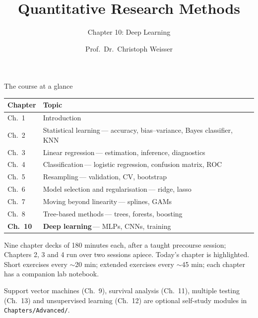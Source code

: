 \documentclass[aspectratio=169,11pt]{beamer}
\title{Quantitative Research Methods}
\subtitle{Chapter 10: Deep Learning}
\author{Prof.\ Dr.\ Christoph Weisser}
\date{}\graphicspath{{images/}}
\begin{document}
\begin{frame}[plain]\titlepage\end{frame}

\begin{frame}{The course at a glance}
  \vspace{-1.5mm}
  \begin{center}
  \scriptsize
  \setlength{\tabcolsep}{5pt}
  \renewcommand{\arraystretch}{1.30}
  \begin{tabular}{@{\hspace{2pt}}l >{\raggedright\arraybackslash}p{}@{\hspace{2pt}}}
    \toprule
    \textbf{Chapter} & \textbf{Topic} \\
    \midrule
     {\color{accent}Ch.\ 1} & Introduction \\
    \rowcolor{black!3} {\color{accent}Ch.\ 2} & Statistical learning\,{\color{black!45}--- accuracy, bias--variance, Bayes classifier, KNN} \\
     {\color{accent}Ch.\ 3} & Linear regression\,{\color{black!45}--- estimation, inference, diagnostics} \\
    \rowcolor{black!3} {\color{accent}Ch.\ 4} & Classification\,{\color{black!45}--- logistic regression, confusion matrix, ROC} \\
     {\color{accent}Ch.\ 5} & Resampling\,{\color{black!45}--- validation, CV, bootstrap} \\
    \rowcolor{black!3} {\color{accent}Ch.\ 6} & Model selection and regularisation\,{\color{black!45}--- ridge, lasso} \\
     {\color{accent}Ch.\ 7} & Moving beyond linearity\,{\color{black!45}--- splines, GAMs} \\
    \rowcolor{black!3} {\color{accent}Ch.\ 8} & Tree-based methods\,{\color{black!45}--- trees, forests, boosting} \\
    \rowcolor{accent!18} \textbf{Ch.\ 10} & \textbf{Deep learning}\,{\color{accent!75!black}--- MLPs, CNNs, training} \\
    \bottomrule
  \end{tabular}
  \end{center}
  \vspace{1mm}
  {\scriptsize Nine chapter decks of 180 minutes each, after a taught precourse session; Chapters 2, 3 and 4 run over two sessions apiece. Today's chapter is highlighted. Short exercises every $\sim$20 min; extended exercises every $\sim$45 min; each chapter has a companion lab notebook.\par\medskip Support vector machines (Ch.\ 9), survival analysis (Ch.\ 11), multiple testing (Ch.\ 13) and unsupervised learning (Ch.\ 12) are optional self-study modules in \texttt{Chapters/Advanced/}.}
\end{frame}
\end{document}
